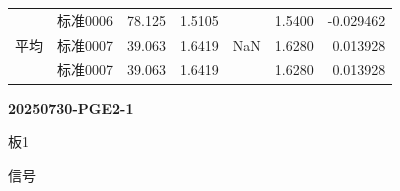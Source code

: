 \documentclass[UTF8,10pt,a4paper,fontset=fandol]{ctexart}
\newcommand{\fieldvalue}[1]{#1}
\begin{document}
\begin{tabularx}{\textwidth}{l l r r r r r}
&
\fieldvalue{标准0006} &
\fieldvalue{78.125} &
\fieldvalue{1.5105} &
&
\fieldvalue{1.5400} &
\fieldvalue{-0.029462}\\

平均 &
\fieldvalue{标准0007} &
\fieldvalue{39.063} &
\fieldvalue{1.6419} &
\fieldvalue{NaN} &
\fieldvalue{1.6280} &
\fieldvalue{0.013928}\\

&
\fieldvalue{标准0007} &
\fieldvalue{39.063} &
\fieldvalue{1.6419} &
&
\fieldvalue{1.6280} &
\fieldvalue{0.013928}\\
\end{tabularx}

\normalsize

\newpage

\noindent\textbf{20250730-PGE2-1}\hfill{}

\medskip
\noindent 板1

\noindent 信号
\end{document}
